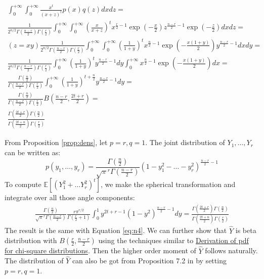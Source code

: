 \documentclass{article}
\def\E{\mathbb{E}}
\begin{document}
\begin{align*}
\int_{0}^{+\infty}\int_{0}^{+\infty} \frac{x^t}{(x+z)^t} p(x)q(z) dxdz =
& \\ \frac{1}{2^{n/2} \Gamma(\frac{n-r}{2})\Gamma(\frac{r}{2})}
\int_{0}^{+\infty}\int_{0}^{+\infty}
\left(\frac{x}{x+z}\right)^t
x^{\frac{r}{2}-1}\exp(-\frac{x}{2})
z^{\frac{n-r}{2}-1}\exp(-\frac{z}{2})dxdz =
& \\ (z=xy) \frac{1}{2^{n/2}\Gamma(\frac{n-r}{2})\Gamma(\frac{r}{2})}
\int_{0}^{+\infty}\int_{0}^{+\infty}
\left(\frac{1}{1+y}\right)^t
x^{\frac{n}{2}-1}\exp(-\frac{x(1+y)}{2})y^{\frac{n-r}{2}-1}dxdy =
& \\  \frac{1}{2^{n/2} \Gamma(\frac{n-r}{2})\Gamma(\frac{r}{2})}
\int_{0}^{+\infty}\left(\frac{1}{1+y}\right)^t
y^{\frac{n-r}{2}-1} dy
\int_{0}^{+\infty} x^{\frac{n}{2}-1}\exp(-\frac{x(1+y)}{2})dx = & \\
\frac{\Gamma(\frac{n}{2})}{\Gamma(\frac{n-r}{2})\Gamma(\frac{r}{2})}
\int_{0}^{+\infty}\left(\frac{1}{1+y}\right)^{t+\frac{n}{2}}
y^{\frac{n-r}{2}-1} dy =
& \\  \frac{\Gamma(\frac{n}{2})}{\Gamma(\frac{n-r}{2})\Gamma(\frac{r}{2})}
B(\frac{n-r}{2}, \frac{2t+r}{2}) =
& \\ \frac{\Gamma(\frac{2t+r}{2})\Gamma(\frac{n}{2})}
{\Gamma(\frac{2t+n}{2})\Gamma(\frac{r}{2})}
\end{align*}

From Proposition \ref{prop:dens}, let $p=r, q=1$. The joint distribution of $Y_1, \dots, Y_r$ can be written as:
$$
p(y_1, \dots, y_r) = \frac{\Gamma(\frac{n}{2})}{\sqrt{\pi}^r \Gamma(\frac{n-r}{2})}(1- y_1^2 - \dots - y_r^2)^{\frac{n-r}{2} -1}
$$
To compute $\E[(Y_1^2 + \dots Y_r^2)^t]$, we
make the spherical transformation and integrate over all those angle components:
\begin{align*}
\frac{\Gamma(\frac{n}{2})}{\sqrt{\pi}^r\Gamma(\frac{n-r}{2})}  \frac{r\pi^{r/2}}{\Gamma(\frac{r}{2}+1)}\int_{0}^1 y^{2t+r-1}(1- y^2)^{\frac{n-r}{2} -1} dy =
\frac{\Gamma(\frac{2t+r}{2})\Gamma(\frac{n}{2})}
{\Gamma(\frac{2t+n}{2})\Gamma(\frac{r}{2})}
\end{align*}
The result is the same with Equation \eqref{eq:n4}. We can further show that $\hat{Y}$ is beta distribution with $B(\frac{r}{2}, \frac{n-r}{2})$ using the techniques similar to \href{https://en.wikipedia.org/wiki/Proofs_related_to_chi-squared_distribution#Derivation_of_the_pdf_for_k_degrees_of_freedom}{Derivation of pdf for chi-square distributions}. Then the higher order moment of $\hat{Y}$ follows naturally. The distribution of $\hat{Y}$ can also be got from Proposition 7.2 in \cite{eaton1989group} by setting $p=r, q=1$.
\end{document}
